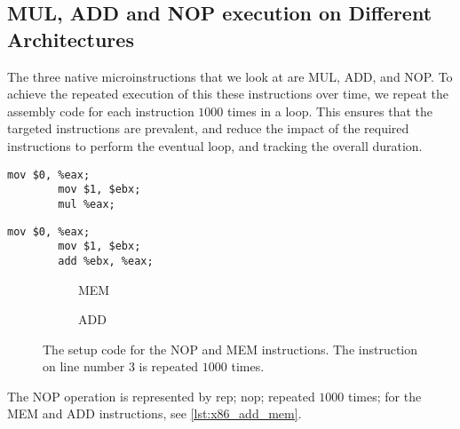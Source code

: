 \subsection{MUL, ADD and NOP execution on Different Architectures}\label{chp4:subsec:MUL_ADD_NOP_instructions}
The three native microinstructions that we look at are MUL, ADD, and NOP.
To achieve the repeated execution of this these instructions over time, we repeat the assembly code for each instruction \(1000\) times in a loop.
This ensures that the targeted instructions are prevalent, and reduce the impact of the required instructions to perform the eventual loop, and tracking the overall duration.

\newsavebox{\MEMfigure}
	\begin{lrbox}{\MEMfigure}%
	\begin{lstlisting}[language={[x86masm]Assembler}]
		mov $0, %eax;
		mov $1, $ebx;
		mul %eax;
	\end{lstlisting}
\end{lrbox}

\newsavebox{\ADDfigure}
	\begin{lrbox}{\ADDfigure}%
	\begin{lstlisting}[language={[x86masm]Assembler}]
		mov $0, %eax;
		mov $1, $ebx;
		add %ebx, %eax;
	\end{lstlisting}
\end{lrbox}

\begin{figure}[h]
    \begin{subfigure}{0.5\textwidth}
        \centering
        \usebox{\MEMfigure}
        \caption{MEM}
    \end{subfigure}
    \begin{subfigure}{0.5\textwidth}
        \centering
        \usebox{\ADDfigure}
        \caption{ADD}
    \end{subfigure}
	\caption{The setup code for the NOP and MEM instructions. The instruction on line number 3 is repeated \(1000\) times.}
	\label{lst:x86_add_mem}
\end{figure}

The NOP operation is represented by rep; nop; repeated \(1000\) times; for the MEM and ADD instructions, see \autoref{lst:x86_add_mem}.



